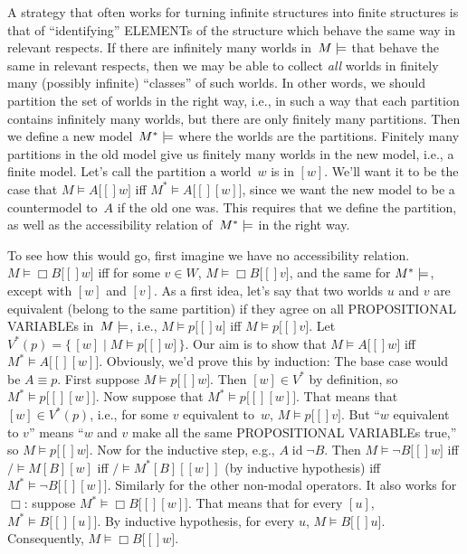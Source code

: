 \documentclass[10pt,a4paper]{article}
\newcommand*{\olup}[1]{\MakeUppercase{#1}}
\theoremstyle{plain}
\theoremstyle{definition}
\theoremstyle{remark}
\providecommand{\mSat}[3]{\ensuremath{#1 \models #2[#3]}}
\providecommand{\mModel}[2]{\ensuremath{#1 \models #2}}
\providecommand{\Setabs}[2]{\{\, #1 \mid #2 \,\}}
\providecommand{\ident}{\operatorname{id}}
\begin{document}
A strategy that often works for turning infinite structures into
finite structures is that of ``identifying'' \olup{element}s of the
structure which behave the same way in relevant respects. If there are
infinitely many worlds in~$\mModel{M}$ that behave the same in
relevant respects, then we may be able to collect \emph{all} worlds in
finitely many (possibly infinite) ``classes'' of such worlds. In other
words, we should partition the set of worlds in the right way, i.e.,
in such a way that each partition contains infinitely many worlds, but
there are only finitely many partitions. Then we define a new
model~$\mModel{M^*}$ where the worlds are the partitions. Finitely
many partitions in the old model give us finitely many worlds in the
new model, i.e., a finite model. Let's call the partition a world~$w$
is in $[w]$. We'll want it to be the case that $\mSat{M}{A}[w]$ iff
$\mSat{M^*}{A}[{[w]}]$, since we want the new model to be a
countermodel to~$A$ if the old one was. This requires that we define
the partition, as well as the accessibility relation of~$\mModel{M^*}$
in the right way.

To see how this would go, first imagine we have no accessibility
relation. $\mSat{M}{\Box B}[w]$ iff for some $v \in W$,
$\mSat{M}{\Box B}[v]$, and the same for $\mModel{M^*}$, except with
$[w]$ and $[v]$. As a first idea, let's say that two worlds $u$ and
$v$ are equivalent (belong to the same partition) if they agree on all
\olup{propositional variable}s in~$\mModel{M}$, i.e., $\mSat{M}{p}[u]$
iff $\mSat{M}{p}[v]$. Let $V^*(p) = \Setabs{[w]}{\mSat{M}{p}[w]}$.
Our aim is to show that $\mSat{M}{A}[w]$ iff
$\mSat{M^*}{A}[{[w]}]$. Obviously, we'd prove this by induction: The
base case would be $A \equiv p$. First suppose $\mSat{M}{p}[w]$. Then
$[w] \in V^*$ by definition, so $\mSat{M^*}{p}[{[w]}]$. Now suppose
that $\mSat{M^*}{p}[{[w]}]$. That means that $[w] \in V^*(p)$, i.e.,
for some $v$ equivalent to~$w$, $\mSat{M}{p}[v]$. But ``$w$ equivalent
to $v$'' means ``$w$ and $v$ make all the same \olup{propositional variable}s
true,'' so $\mSat{M}{p}[w]$. Now for the inductive step, e.g., $A
\ident \lnot B$. Then $\mSat{M}{\lnot B}[w]$ iff $\mSat/{M}{B}[w]$
iff $\mSat/{M^*}{B}[{[w]}]$ (by inductive hypothesis) iff
$\mSat{M^*}{\lnot B}[{[w]}]$. Similarly for the other non-modal
operators. It also works for $\Box$: suppose $\mSat{M^*}{\Box
  B}[{[w]}]$. That means that for every $[u]$,
$\mSat{M^*}{B}[{[u]}]$. By inductive hypothesis, for every $u$,
$\mSat{M}{B}[u]$. Consequently, $\mSat{M}{\Box B}[w]$.
\end{document}
